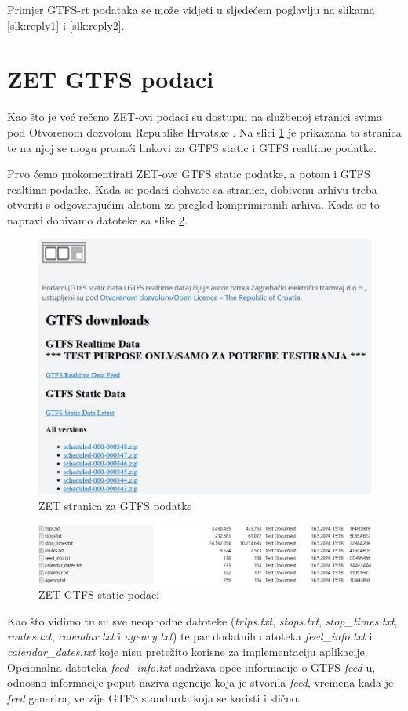 \documentclass[zavrsnirad]{fer}
\begin{document}
Primjer GTFS-rt podataka se može vidjeti u sljedećem poglavlju na slikama \ref{slk:reply1} i \ref{slk:reply2}.

\section{ZET GTFS podaci}
\label{sec:zet-gtfs}

Kao što je već rečeno ZET-ovi podaci su dostupni na službenoj stranici svima pod Otvorenom dozvolom Republike Hrvatske \cite{ZET-GTFS}. Na slici \ref{slk:zet-stranica} je prikazana ta stranica te na njoj se mogu pronaći linkovi za GTFS static i GTFS realtime podatke.

Prvo ćemo prokomentirati ZET-ove GTFS static podatke, a potom i GTFS realtime podatke. Kada se podaci dohvate sa stranice, dobivenu arhivu treba otvoriti s odgovarajućim alatom za pregled komprimiranih arhiva. Kada se to napravi dobivamo datoteke sa slike \ref{slk:zet-podaci}.

\begin{figure}[htb]
	\centering
	\includegraphics[width=0.7\linewidth]{Figures/zet-stranica.jpg} 
	\caption{ZET stranica za GTFS podatke}
	\label{slk:zet-stranica}
\end{figure} 

\begin{figure}[htb]
	\centering
	\includegraphics[width=0.7\linewidth]{Figures/zet-podaci.jpg} 
	\caption{ZET GTFS static podaci}
	\label{slk:zet-podaci}
\end{figure} 

Kao što vidimo tu su sve neophodne datoteke (\textit{trips.txt}, \textit{stops.txt}, \textit{stop\_times.txt}, \textit{routes.txt}, \textit{calendar.txt} i \textit{agency.txt}) te par dodatnih datoteka \textit{feed\_info.txt} i \textit{calendar\_dates.txt} koje nisu pretežito korisne za implementaciju aplikacije. Opcionalna datoteka \textit{feed\_info.txt} sadržava opće informacije o GTFS \textit{feed}-u, odnosno  informacije poput naziva agencije koja je stvorila \textit{feed}, vremena kada je \textit{feed} generira, verzije GTFS standarda koja se koristi i slično.
\end{document}
